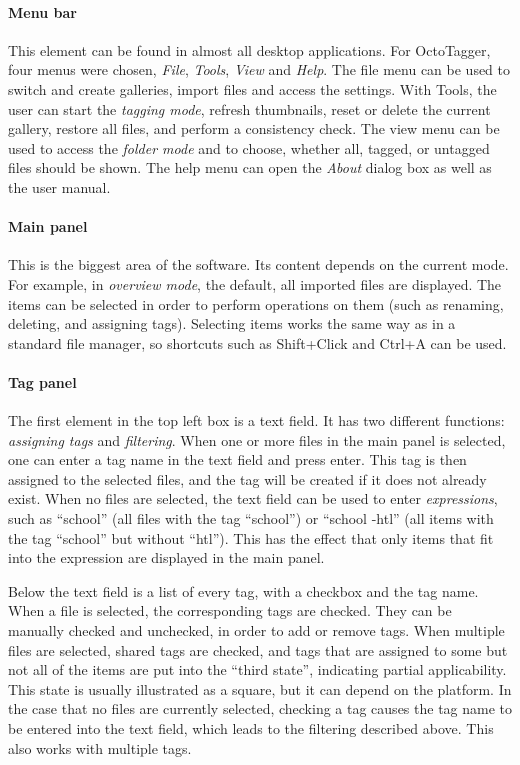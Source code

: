 \paragraph{Menu bar} This element can be found in almost all desktop
applications. For OctoTagger, four menus were chosen, \emph{File},
\emph{Tools}, \emph{View} and \emph{Help}. The file menu can be used to switch
and create galleries, import files and access the settings. With Tools, the
user can start the \emph{tagging mode}, refresh thumbnails, reset or delete the
current gallery, restore all files, and perform a consistency check.  The view
menu can be used to access the \emph{folder mode} and to choose, whether all,
tagged, or untagged files should be shown. The help menu can open the \emph{About} 
dialog box as well as the user manual.

\paragraph{Main panel} This is the biggest area of the software. Its content
depends on the current mode. For example, in \emph{overview mode}, the default,
all imported files are displayed. The items can be selected in order to perform
operations on them (such as renaming, deleting, and assigning tags). Selecting
items works the same way as in a standard file manager, so shortcuts
such as Shift+Click and Ctrl+A can be used. %

\paragraph{Tag panel} The first element in the top left box is a text field. It
has two different functions: \emph{assigning tags} and \emph{filtering}.  When
one or more files in the main panel is selected, one can enter a tag name in
the text field and press enter. This tag is then assigned to the selected
files, and the tag will be created if it does not already exist. When no files
are selected, the text field can be used to enter \emph{expressions}, such as
``school'' (all files with the tag ``school'') or ``school -htl'' (all items
with the tag ``school'' but without ``htl''). This has the effect that only
items that fit into the expression are displayed in the main panel.

Below the text field is a list of every tag, with a checkbox and the tag name.
When a file is selected, the corresponding tags are checked. They can be
manually checked and unchecked, in order to add or remove tags. When multiple
files are selected, shared tags are checked, and tags that are assigned to some
but not all of the items are put into the ``third state'', indicating partial
applicability. This state is usually illustrated as a square, but it can depend
on the platform. In the case that no files are currently selected, checking a
tag causes the tag name to be entered into the text field, which leads to the
filtering described above. This also works with multiple tags.

